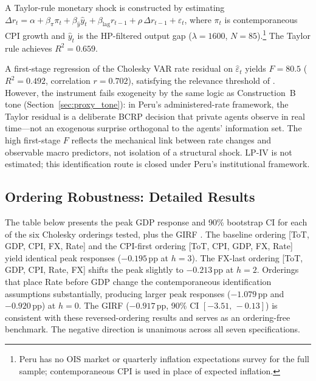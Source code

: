 \documentclass[12pt,letterpaper]{article}
\begin{document}
A Taylor-rule monetary shock is constructed by estimating
$\Delta r_t = \alpha + \beta_\pi \pi_t + \beta_{\hat y}\hat{y}_t
+ \beta_{\text{lag}} r_{t-1} + \rho\,\Delta r_{t-1} + \varepsilon_t$,
where $\pi_t$ is contemporaneous CPI growth and $\hat{y}_t$ is the
HP-filtered output gap ($\lambda=1600$, $N=85$).\footnote{Peru has no
OIS market or quarterly inflation expectations survey for the full sample;
contemporaneous CPI is used in place of expected inflation.}
The Taylor rule achieves $R^2=0.659$.

A first-stage regression of the Cholesky VAR rate residual on
$\hat\varepsilon_t$ yields $F=80.5$ ($R^2=0.492$, correlation
$r=0.702$), satisfying the relevance threshold of \citet{stock2018}.
However, the instrument fails exogeneity by the same logic as
Construction~B tone (Section~\ref{sec:proxy_tone}): in Peru's
administered-rate framework, the Taylor residual is a deliberate BCRP
decision that private agents observe in real time---not an exogenous
surprise orthogonal to the agents' information set. The high first-stage
$F$ reflects the mechanical link between rate changes and observable macro
predictors, not isolation of a structural shock. LP-IV is not estimated;
this identification route is closed under Peru's institutional
framework.

\subsection{Ordering Robustness: Detailed Results}
\label{app:rob:order_table}

The table below presents the peak GDP response and 90\%
bootstrap CI for each of the six Cholesky orderings tested, plus the
GIRF \citep{pesaran1998}. The baseline ordering [ToT, GDP, CPI, FX,
Rate] and the CPI-first ordering [ToT, CPI, GDP, FX, Rate] yield
identical peak responses ($-0.195$\,pp at $h=3$). The FX-last
ordering [ToT, GDP, CPI, Rate, FX] shifts the peak slightly to
$-0.213$\,pp at $h=2$. Orderings that place Rate before GDP change
the contemporaneous identification assumptions substantially, producing
larger peak responses ($-1.079$\,pp and $-0.920$\,pp) at $h=0$.
The GIRF ($-0.917$\,pp, 90\% CI $[-3.51,\,-0.13]$) is consistent
with these reversed-ordering results and serves as an ordering-free
benchmark. The negative direction is unanimous across all seven
specifications.
\end{document}
